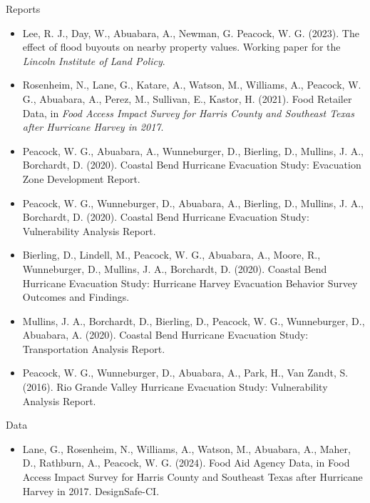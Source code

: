 \documentclass[11pt,oneside]{article}
\begin{document}
{Reports}
\begin{itemize}[leftmargin=20pt]
\item Lee, R. J., Day, W., Abuabara, A., Newman, G. Peacock, W. G. (2023). The effect of flood buyouts on nearby property values. Working paper for the \emph{Lincoln Institute of Land Policy}.
\item Rosenheim, N., Lane, G., Katare, A., Watson, M., Williams, A., Peacock, W. G., Abuabara, A., Perez, M., Sullivan, E., Kastor, H. (2021). Food Retailer Data, in \emph{Food Access Impact Survey for Harris County and Southeast Texas after Hurricane Harvey in 2017}.
\item Peacock, W. G., Abuabara, A., Wunneburger, D., Bierling, D., Mullins, J. A., Borchardt, D. (2020). Coastal Bend Hurricane Evacuation Study: Evacuation Zone Development Report.
\item Peacock, W. G., Wunneburger, D., Abuabara, A., Bierling, D., Mullins, J. A., Borchardt, D. (2020). Coastal Bend Hurricane Evacuation Study: Vulnerability Analysis Report.
\item Bierling, D., Lindell, M., Peacock, W. G., Abuabara, A., Moore, R., Wunneburger, D., Mullins, J. A., Borchardt, D. (2020). Coastal Bend Hurricane Evacuation Study: Hurricane Harvey Evacuation Behavior Survey Outcomes and Findings.
\item Mullins, J. A., Borchardt, D., Bierling, D., Peacock, W. G., Wunneburger, D., Abuabara, A. (2020). Coastal Bend Hurricane Evacuation Study: Transportation Analysis Report.
\item Peacock, W. G., Wunneburger, D., Abuabara, A., Park, H., Van Zandt, S. (2016). Rio Grande Valley Hurricane Evacuation Study: Vulnerability Analysis Report.
\end{itemize}

\vspace{3pt}

{Data}
\begin{itemize}[leftmargin=20pt]
\item Lane, G., Rosenheim, N., Williams, A., Watson, M., Abuabara, A., Maher, D., Rathburn, A., Peacock, W. G. (2024). Food Aid Agency Data, in Food Access Impact Survey for Harris County and Southeast Texas after Hurricane Harvey in 2017. DesignSafe-CI.
\end{itemize}

\vspace{3pt}
\end{document}
